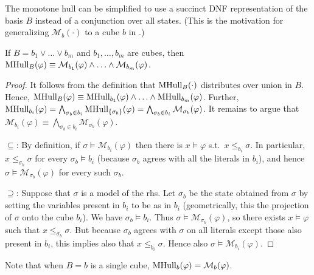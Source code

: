 \documentclass[acmsmall,screen]{acmart}
\newcommand{\toolong}[1]{#1}
\newcommand{\toolong}[1]{}
\newcommand{\set}[1]{\{{#1}\}}
\newcommand{\monox}[2]{\mathcal{M}_{#2}({#1})}
\newcommand{\mhull}[2]{{\rm MHull}_{#2}({#1})}
\begin{document}
The monotone hull can be simplified to use a succinct DNF representation of the basis $B$ instead of a conjunction over all states.
(This is the motivation for generalizing $\monox{\cdot}{b}$ to a cube $b$ in .)
%
%
%
\begin{lemma}
\label{lem:mhull-dnf-base}
If $B = b_1 \lor \ldots \lor b_m$ and $b_1,\ldots,b_m$ are cubes, then $\mhull{\varphi}{B} \equiv \monox{\varphi}{b_1} \land \ldots \land \monox{\varphi}{b_m}$.
\end{lemma}
\toolong{
\begin{proof}
It follows from the definition that $\mhull{\cdot}{B}$ distributes over union in $B$.
Hence, $\mhull{\varphi}{B} \equiv \mhull{\varphi}{b_1} \land \ldots \land \mhull{\varphi}{b_m}$.
Further, $\mhull{\varphi}{b_i} = \bigwedge_{\sigma_b \in b_i}{\mhull{\varphi}{\set{\sigma_b}}} = \bigwedge_{\sigma_b \in b_i}{\monox{\varphi}{\sigma_b}}$.
It remains to argue that $\monox{\varphi}{b_i} \equiv \bigwedge_{\sigma_b \in b_i}{\monox{\varphi}{\sigma_b}}$.

\noindent
$\subseteq$:
By definition, if $\sigma \models \monox{\varphi}{b_i}$ then there is $x \models \varphi$ s.t.\ $x \leq_{b_i} \sigma$. In particular, $x \leq_{\sigma_b} \sigma$ for every $\sigma_b \models b_i$ (because $\sigma_b$ agrees with all the literals in $b_i$), and hence $\sigma \models \monox{\varphi}{\sigma_b}$ for every such $\sigma_b$.

\noindent
$\supseteq$:
Suppose that $\sigma$ is a model of the rhs. Let $\sigma_b$ be the state obtained from $\sigma$ by setting the variables present in $b_i$ to be as in $b_i$ (geometrically, this the projection of $\sigma$ onto the cube $b_i$). We have $\sigma_b \models b_i$. Thus $\sigma \models \monox{\varphi}{\sigma_b}$, so there exists $x \models \varphi$ such that $x \leq_{\sigma_b} \sigma$. But because $\sigma_b$ agrees with $\sigma$ on all literals except those also present in $b_i$, this implies also that $x \leq_{b_i} \sigma$. Hence also $\sigma \models \monox{\varphi}{b_i}$.
\end{proof}
}
Note that when $B = b$ is a single cube, $\mhull{\varphi}{b} = \monox{\varphi}{b}$.
\end{document}
